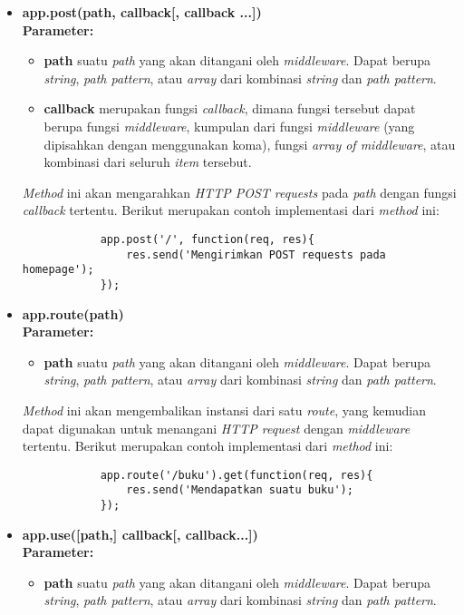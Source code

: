 \begin{itemize}
	\item \textbf{app.post(path, callback[, callback ...])} \\ \textbf{Parameter:}
		\begin{itemize}
			\item \textbf{path} suatu \textit{path} yang akan ditangani oleh \textit{middleware}. Dapat berupa \textit{string}, \textit{path pattern}, atau \textit{array} dari kombinasi \textit{string} dan \textit{path pattern}.
			
			\item \textbf{callback} merupakan fungsi \textit{callback}, dimana fungsi tersebut dapat berupa fungsi \textit{middleware}, kumpulan dari fungsi \textit{middleware} (yang dipisahkan dengan menggunakan koma), fungsi \textit{array of middleware}, atau kombinasi dari seluruh \textit{item} tersebut.
		\end{itemize}
	
		\textit{Method} ini akan mengarahkan \textit{HTTP POST requests} pada \textit{path} dengan fungsi \textit{callback} tertentu. Berikut merupakan contoh implementasi dari \textit{method} ini:
		\begin{lstlisting}
			app.post('/', function(req, res){
				res.send('Mengirimkan POST requests pada homepage');
			});
		\end{lstlisting}
		
	\item \textbf{app.route(path)} \\ \textbf{Parameter:}
		\begin{itemize}
			\item \textbf{path} suatu \textit{path} yang akan ditangani oleh \textit{middleware}. Dapat berupa \textit{string}, \textit{path pattern}, atau \textit{array} dari kombinasi \textit{string} dan \textit{path pattern}.
		\end{itemize}
		
		\textit{Method} ini akan mengembalikan instansi dari satu \textit{route}, yang kemudian dapat digunakan untuk menangani \textit{HTTP request} dengan \textit{middleware} tertentu. Berikut merupakan contoh implementasi dari \textit{method} ini:
		\begin{lstlisting}
			app.route('/buku').get(function(req, res){
				res.send('Mendapatkan suatu buku');
			});
		\end{lstlisting}
		
	\item \textbf{app.use([path,] callback[, callback...])} \\ \textbf{Parameter:} 
		\begin{itemize}
			\item \textbf{path} suatu \textit{path} yang akan ditangani oleh \textit{middleware}. Dapat berupa \textit{string}, \textit{path pattern}, atau \textit{array} dari kombinasi \textit{string} dan \textit{path pattern}.
			

\end{itemize}
\end{itemize}

